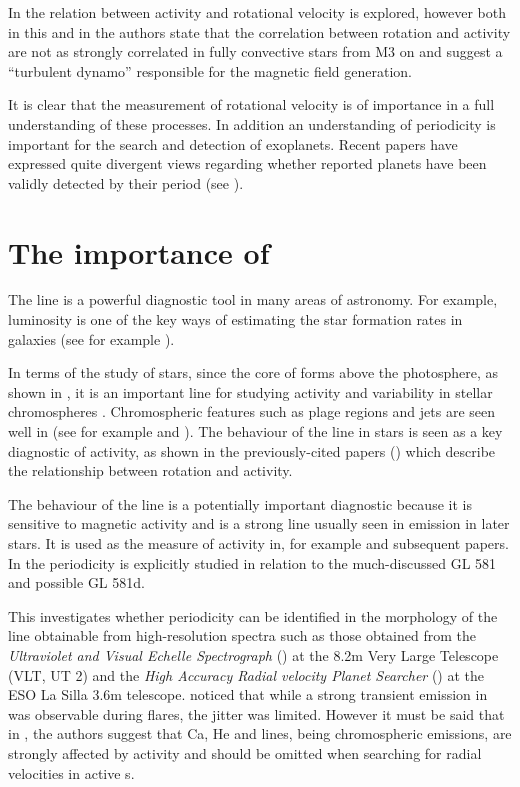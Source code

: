 In \citet{mohanty02} the relation between activity and rotational velocity is explored, however both in this and in
\citet{mohanty03} the authors state that the correlation between rotation and activity are not as strongly correlated in
fully convective stars from M3 on and suggest a ``turbulent dynamo'' responsible for the magnetic field generation.

It is clear that the measurement of rotational velocity is of importance in a full understanding of these processes. In
addition an understanding of periodicity is important for the search and detection of exoplanets. Recent papers have
expressed quite divergent views regarding whether reported planets have been validly detected by their period (see
\citealt{barnes13,robertson14,robertson14a,tuomi13aug,robertson15}). 

\section{The importance of {\ha}}
\protect\label{section:intohalpha}

The {\ha} line is a powerful diagnostic tool in many areas of astronomy. For example, {\ha} luminosity is one of the key
ways of estimating the star formation rates in galaxies (see for example \citet{rosagonzalez02}).

In terms of the study of stars, since the core of {\ha} forms above the photosphere, as shown in \citep{vernazza81}, it
is an important line for studying activity and variability in stellar chromospheres \citep{hall08}. Chromospheric
features such as plage regions and jets are seen well in {\ha} (see for example \citet{kneer10} and \citet{kuridze11}).
The behaviour of the {\ha} line in {\rdwarf} stars is seen as a key diagnostic of activity, as shown in the
previously-cited papers (\citealt{mohanty02, mohanty03, reiners08, schmidt14}) which describe the relationship between
rotation and activity.

The behaviour of the {\ha} line is a potentially important diagnostic because it is sensitive to magnetic activity and
is a strong line usually seen in emission in later {\rdwarf} stars. It is used as the measure of activity in, for
example \citet{mohanty03} and subsequent papers. In \citet{hatzes15} the {\ha} periodicity is explicitly studied in
relation to the much-discussed GL 581 and possible GL 581d.

This {\paperorthesis} investigates whether periodicity can be identified in the morphology of the {\ha} line obtainable
from high-resolution spectra such as those obtained from the \textit{Ultraviolet and Visual Echelle Spectrograph}
({\uves}) at the 8.2m Very Large Telescope (VLT, UT 2) and the \textit{High Accuracy Radial velocity Planet Searcher}
({\harps}) at the ESO La Silla 3.6m telescope. \citet{barnes14} noticed that while a strong transient emission in {\ha}
was observable during flares, the jitter was limited. However it must be said that in \citet{reiners09}, the authors
suggest that Ca, He and {\ha} lines, being chromospheric emissions, are strongly affected by activity and should be
omitted when searching for radial velocities in active \rdwarf s.

